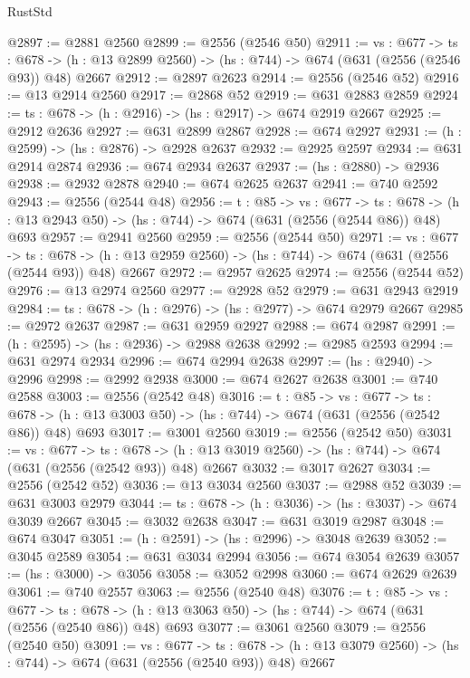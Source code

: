 \begin{lexlean}{RustStd}
\begin{coremodule}
@2897 := @2881 @2560
@2899 := @2556 (@2546 @50)
@2911 := {vs : @677} ->
  {ts : @678} -> (h : @13 @2899 @2560) -> (hs : @744) -> @674 (@631 (@2556 (@2546 @93)) @48) @2667
@2912 := @2897 @2623
@2914 := @2556 (@2546 @52)
@2916 := @13 @2914 @2560
@2917 := @2868 @52
@2919 := @631 @2883 @2859
@2924 := {ts : @678} -> (h : @2916) -> (hs : @2917) -> @674 @2919 @2667
@2925 := @2912 @2636
@2927 := @631 @2899 @2867
@2928 := @674 @2927
@2931 := (h : @2599) -> (hs : @2876) -> @2928 @2637
@2932 := @2925 @2597
@2934 := @631 @2914 @2874
@2936 := @674 @2934 @2637
@2937 := (hs : @2880) -> @2936
@2938 := @2932 @2878
@2940 := @674 @2625 @2637
@2941 := @740 @2592
@2943 := @2556 (@2544 @48)
@2956 := {t : @85} ->
  {vs : @677} ->
  {ts : @678} -> (h : @13 @2943 @50) -> (hs : @744) -> @674 (@631 (@2556 (@2544 @86)) @48) @693
@2957 := @2941 @2560
@2959 := @2556 (@2544 @50)
@2971 := {vs : @677} ->
  {ts : @678} -> (h : @13 @2959 @2560) -> (hs : @744) -> @674 (@631 (@2556 (@2544 @93)) @48) @2667
@2972 := @2957 @2625
@2974 := @2556 (@2544 @52)
@2976 := @13 @2974 @2560
@2977 := @2928 @52
@2979 := @631 @2943 @2919
@2984 := {ts : @678} -> (h : @2976) -> (hs : @2977) -> @674 @2979 @2667
@2985 := @2972 @2637
@2987 := @631 @2959 @2927
@2988 := @674 @2987
@2991 := (h : @2595) -> (hs : @2936) -> @2988 @2638
@2992 := @2985 @2593
@2994 := @631 @2974 @2934
@2996 := @674 @2994 @2638
@2997 := (hs : @2940) -> @2996
@2998 := @2992 @2938
@3000 := @674 @2627 @2638
@3001 := @740 @2588
@3003 := @2556 (@2542 @48)
@3016 := {t : @85} ->
  {vs : @677} ->
  {ts : @678} -> (h : @13 @3003 @50) -> (hs : @744) -> @674 (@631 (@2556 (@2542 @86)) @48) @693
@3017 := @3001 @2560
@3019 := @2556 (@2542 @50)
@3031 := {vs : @677} ->
  {ts : @678} -> (h : @13 @3019 @2560) -> (hs : @744) -> @674 (@631 (@2556 (@2542 @93)) @48) @2667
@3032 := @3017 @2627
@3034 := @2556 (@2542 @52)
@3036 := @13 @3034 @2560
@3037 := @2988 @52
@3039 := @631 @3003 @2979
@3044 := {ts : @678} -> (h : @3036) -> (hs : @3037) -> @674 @3039 @2667
@3045 := @3032 @2638
@3047 := @631 @3019 @2987
@3048 := @674 @3047
@3051 := (h : @2591) -> (hs : @2996) -> @3048 @2639
@3052 := @3045 @2589
@3054 := @631 @3034 @2994
@3056 := @674 @3054 @2639
@3057 := (hs : @3000) -> @3056
@3058 := @3052 @2998
@3060 := @674 @2629 @2639
@3061 := @740 @2557
@3063 := @2556 (@2540 @48)
@3076 := {t : @85} ->
  {vs : @677} ->
  {ts : @678} -> (h : @13 @3063 @50) -> (hs : @744) -> @674 (@631 (@2556 (@2540 @86)) @48) @693
@3077 := @3061 @2560
@3079 := @2556 (@2540 @50)
@3091 := {vs : @677} ->
  {ts : @678} -> (h : @13 @3079 @2560) -> (hs : @744) -> @674 (@631 (@2556 (@2540 @93)) @48) @2667

\end{coremodule}
\end{lexlean}
